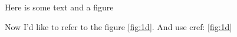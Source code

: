 \documentclass{article}
\begin{document}
Here is some text and a figure

\begin{figure}

  \begin{minipage}[tbh]{\linewidth}
    \centering
    \captionsetup{justification=raggedright}
    \qquad
    \qquad

%

  \end{minipage}

  \label{fig:1}

\end{figure}

Now I'd like to refer to the figure \ref{fig:1d}. And use cref: \cref{fig:1d}
\end{document}
